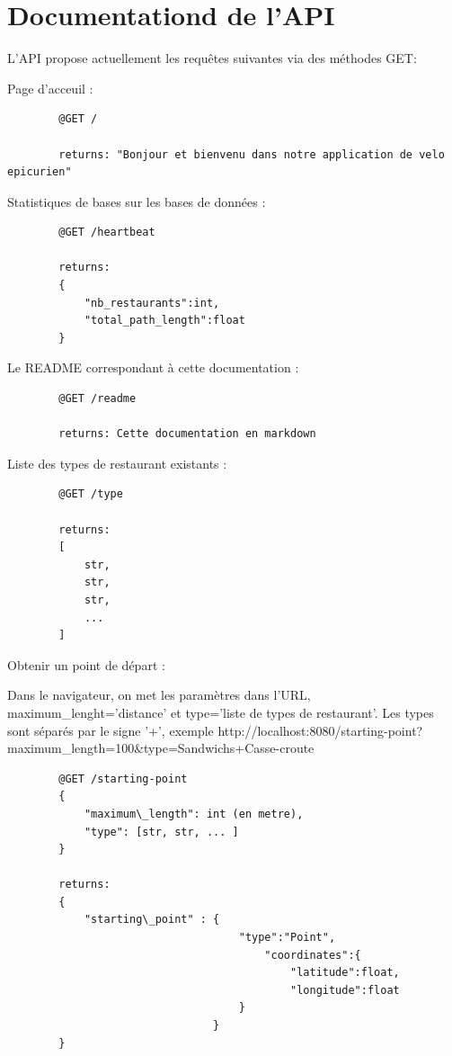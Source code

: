 \documentclass[12pt]{article}
\begin{document}
\section{Documentationd de l'API}

    L'API propose actuellement les requêtes suivantes via des méthodes GET:

    Page d'acceuil :

    \begin{lstlisting}
        @GET /

        returns: "Bonjour et bienvenu dans notre application de velo epicurien"
    \end{lstlisting}

    Statistiques de bases sur les bases de données :

    \begin{lstlisting}
        @GET /heartbeat

        returns:
        {
            "nb_restaurants":int,
            "total_path_length":float
        }
    \end{lstlisting}

    Le README correspondant à cette documentation :

    \begin{lstlisting}
        @GET /readme
        
        returns: Cette documentation en markdown
    \end{lstlisting}

    Liste des types de restaurant existants :
    
    \begin{lstlisting}
        @GET /type

        returns:
        [
            str,
            str,
            str,
            ...
        ]
    \end{lstlisting}

    Obtenir un point de départ : 

    Dans le navigateur, on met les paramètres dans l'URL, maximum\_lenght='distance' et type='liste de types de restaurant'. Les types sont séparés par le signe '+', exemple http://localhost:8080/starting-point?maximum\_length=100\&type=Sandwichs+Casse-croute

    \begin{lstlisting}
        @GET /starting-point
        {
            "maximum\_length": int (en metre),
            "type": [str, str, ... ]
        }

        returns:
        {
            "starting\_point" : {
                                    "type":"Point", 
                                        "coordinates":{
                                            "latitude":float, 
                                            "longitude":float
                                    }
                                }
        }
    \end{lstlisting}
\end{document}
